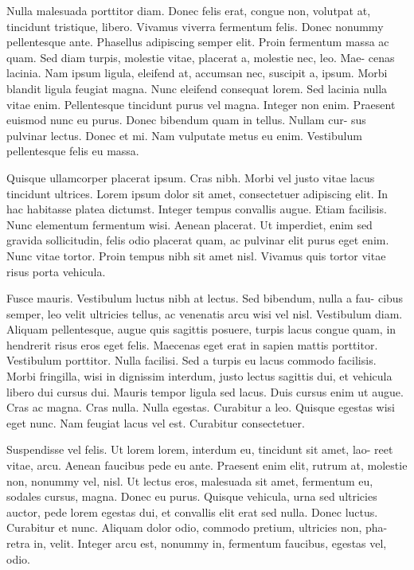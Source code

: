 \documentclass{article}
\begin{document}
Nulla malesuada porttitor diam. Donec felis erat, congue non, volutpat at, tincidunt tristique, libero. Vivamus viverra fermentum felis. Donec nonummy pellentesque ante. Phasellus adipiscing semper elit. Proin fermentum massa ac quam. Sed diam turpis, molestie vitae, placerat a, molestie nec, leo. Mae- cenas lacinia. Nam ipsum ligula, eleifend at, accumsan nec, suscipit a, ipsum. Morbi blandit ligula feugiat magna. Nunc eleifend consequat lorem. Sed lacinia nulla vitae enim. Pellentesque tincidunt purus vel magna. Integer non enim. Praesent euismod nunc eu purus. Donec bibendum quam in tellus. Nullam cur- sus pulvinar lectus. Donec et mi. Nam vulputate metus eu enim. Vestibulum pellentesque felis eu massa.

Quisque ullamcorper placerat ipsum. Cras nibh. Morbi vel justo vitae lacus tincidunt ultrices. Lorem ipsum dolor sit amet, consectetuer adipiscing elit. In hac habitasse platea dictumst. Integer tempus convallis augue. Etiam facilisis. Nunc elementum fermentum wisi. Aenean placerat. Ut imperdiet, enim sed gravida sollicitudin, felis odio placerat quam, ac pulvinar elit purus eget enim. Nunc vitae tortor. Proin tempus nibh sit amet nisl. Vivamus quis tortor vitae risus porta vehicula.

Fusce mauris. Vestibulum luctus nibh at lectus. Sed bibendum, nulla a fau- cibus semper, leo velit ultricies tellus, ac venenatis arcu wisi vel nisl. Vestibulum diam. Aliquam pellentesque, augue quis sagittis posuere, turpis lacus congue quam, in hendrerit risus eros eget felis. Maecenas eget erat in sapien mattis porttitor. Vestibulum porttitor. Nulla facilisi. Sed a turpis eu lacus commodo facilisis. Morbi fringilla, wisi in dignissim interdum, justo lectus sagittis dui, et vehicula libero dui cursus dui. Mauris tempor ligula sed lacus. Duis cursus enim ut augue. Cras ac magna. Cras nulla. Nulla egestas. Curabitur a leo. Quisque egestas wisi eget nunc. Nam feugiat lacus vel est. Curabitur consectetuer.

Suspendisse vel felis. Ut lorem lorem, interdum eu, tincidunt sit amet, lao- reet vitae, arcu. Aenean faucibus pede eu ante. Praesent enim elit, rutrum at, molestie non, nonummy vel, nisl. Ut lectus eros, malesuada sit amet, fermentum eu, sodales cursus, magna. Donec eu purus. Quisque vehicula, urna sed ultricies auctor, pede lorem egestas dui, et convallis elit erat sed nulla. Donec luctus. Curabitur et nunc. Aliquam dolor odio, commodo pretium, ultricies non, pha- retra in, velit. Integer arcu est, nonummy in, fermentum faucibus, egestas vel, odio.
\end{document}
